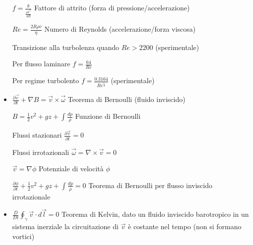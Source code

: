 \documentclass[a4paper]{article}
\begin{document}
\begin{itemize}
	$f=\frac{k}{\frac{\rho \overline{v}^2}{4R}}$ Fattore di attrito (forza di pressione/accelerazione)
	
	$Re = \frac{2R\rho \overline{v}}{\eta} $ Numero di Reynolds (accelerazione/forza viscosa)
	
	Transizione alla turbolenza quando $Re > 2200$ (sperimentale)
	
	Per flusso laminare $f = \frac{64}{Re}$
	
	Per regime turbolento $f= \frac{0.3164}{Re^\frac{1}{4}}$ (sperimentale)
	
	\item $\frac{\partial \overrightarrow{v}}{\partial t} + \nabla B = \overrightarrow{v} \times \overrightarrow{\omega}$ Teorema di Bernoulli (fluido inviscido)
	
	$B=\frac{1}{2}v^2 + gz + \int \frac{dp}{\rho}$ Funzione di Bernoulli
	
	Flussi stazionari $\frac{\partial \overrightarrow{v}}{\partial t}=0$
	
	Flussi irrotazionali $\overrightarrow{\omega}=\nabla \times \overrightarrow{v}=0$
	
	$\overrightarrow{v}=\nabla \phi$ Potenziale di velocità $\phi$
	
	$\frac{\partial \phi}{\partial t}+\frac{1}{2}v^2 + gz + \int \frac{dp}{\rho}=0$ Teorema di Bernoulli per flusso inviscido irrotazionale
	
	\item $ \frac{D}{Dt} \oint_\gamma \overrightarrow{v} \cdot d\overrightarrow{l} = 0 $ Teorema di Kelvin, dato un fluido inviscido barotropico in un sistema inerziale la circuitazione di $\overrightarrow{v}$ è costante nel tempo (non si formano vortici)
	
\end{itemize}	
	
\end{document}
